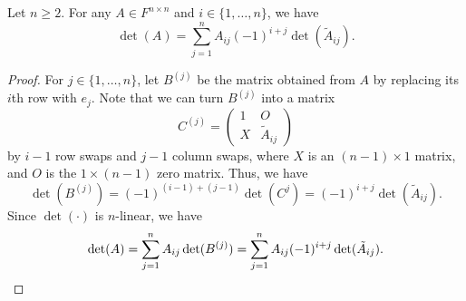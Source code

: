 \begin{theorem}
  Let $n \geq 2$.
  For any $A \in F^{n \times n}$ and $i \in \{1, \dots, n\}$, we have
  \begin{equation*}
    \det(A) = \sum_{j=1}^n A_{ij} (-1)^{i+j} \det(\tilde A_{ij}).
  \end{equation*}
\end{theorem}
\begin{proof}
  For $j \in \{1, \dots, n\}$, let $B^{(j)}$ be the matrix obtained from $A$
  by replacing its $i$th row with $e_j$.
  Note that we can turn $B^{(j)}$ into a matrix
  \begin{equation*}
    C^{(j)} =
    \begin{pmatrix}
      1 & O \\
      X & \tilde A_{ij}
    \end{pmatrix}
  \end{equation*}
  by $i-1$ row swaps and $j-1$ column swaps, where $X$ is an $(n-1) \times 1$
  matrix, and $O$ is the $1 \times (n-1)$ zero matrix.
  Thus, we have
  \begin{equation*}
    \det(B^{(j)})
    = (-1)^{(i-1)+(j-1)} \det(C^{j})
    = (-1)^{i+j} \det(\tilde A_{ij}).
  \end{equation*}
  Since $\det(\cdot)$ is $n$-linear, we have
  \begin{equation*}
    \det(A)
    = \sum_{j=1}^n A_{ij} \det(B^{(j)})
    = \sum_{j=1}^n A_{ij} (-1)^{i+j} \det(\tilde A_{ij}).
    \qedhere
  \end{equation*}
\end{proof}